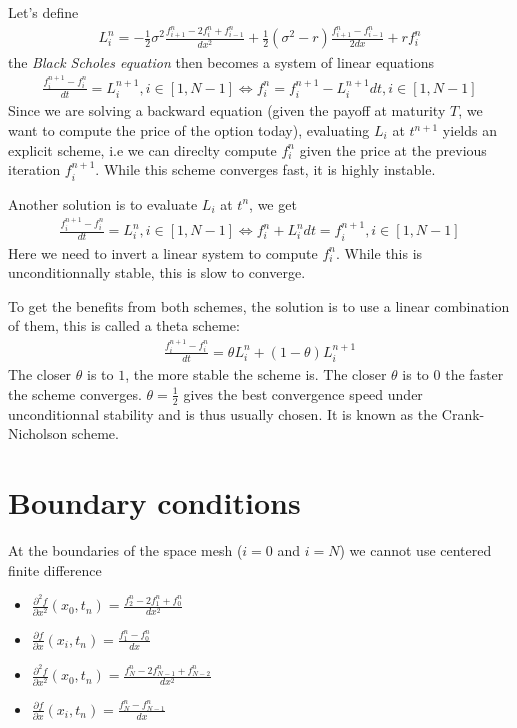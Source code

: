 \documentclass[a4paper]{article}
\begin{document}
Let's define
\begin{gather*}L_i^n = -\frac{1}{2}\sigma^2\frac{f_{i+1}^n - 2 f_i^n + f_{i-1}^n}{dx^2} + \frac{1}{2}(\sigma^2 - r)  \frac{f_{i+1}^n - f_{i-1}^n}{2dx} + rf_i^n
\end{gather*}  the \textit{Black Scholes equation} then becomes a system of linear equations
\begin{gather*}
\frac{f_i^{n+1} - f_i^{n}}{dt} = L_i^{n+1}, i \in [1, N-1] \Longleftrightarrow
f_i^n = f_i^{n+1} - L_i^{n+1}dt, i \in [1, N-1]
\end{gather*}
Since we are solving a backward equation (given the payoff at maturity $T$, we want to compute the price of the option today), evaluating $L_i$ 
at $t^{n+1}$ yields an explicit scheme, i.e we can direclty compute $f_i^n$ given the price at the previous iteration $f_i^{n+1}$. While this scheme
converges fast, it is highly instable.

Another solution is to evaluate $L_i$ at $t^n$, we get
\begin{gather*}
\frac{f_i^{n+1} - f_i^{n}}{dt} = L_i^{n}, i \in [1, N-1] \Longleftrightarrow
f_i^n + L_i^n dt = f_i^{n+1}, i \in [1, N-1]
\end{gather*}
Here we need to invert a linear system to compute $f_i^n$. While this is unconditionnally stable, this is slow to converge.

To get the benefits from both schemes, the solution is to use a linear combination of them, this is called a theta scheme:
\begin{gather*}
\frac{f_i^{n+1} - f_i^{n}}{dt} = \theta L_i^n + (1-\theta) L_i^{n+1}
\end{gather*}
The closer $\theta$ is to $1$, the more stable the scheme is. The closer $\theta$ is to $0$ the faster the scheme converges. $\theta = \frac{1}{2}$ gives
the best convergence speed under unconditionnal stability and is thus usually chosen. It is known as the Crank-Nicholson scheme.

\section{Boundary conditions}

At the boundaries of the space mesh ($i = 0$ and $i = N$) we cannot use centered finite difference
\begin{itemize}
\item $\frac{\partial^2 f}{\partial x^2}(x_0, t_n) = \frac{f_{2}^n - 2f_{1}^n + f_{0}^n}{dx^2}$
\item $\frac{\partial f}{\partial x}(x_i, t_n) = \frac{f_{1}^n - f_{0}^n}{dx}$
\item $\frac{\partial^2 f}{\partial x^2}(x_0, t_n) = \frac{f_{N}^n - 2f_{N-1}^n + f_{N-2}^n}{dx^2}$
\item $\frac{\partial f}{\partial x}(x_i, t_n) = \frac{f_{N}^n - f_{N-1}^n}{dx}$
\end{itemize}
\end{document}
